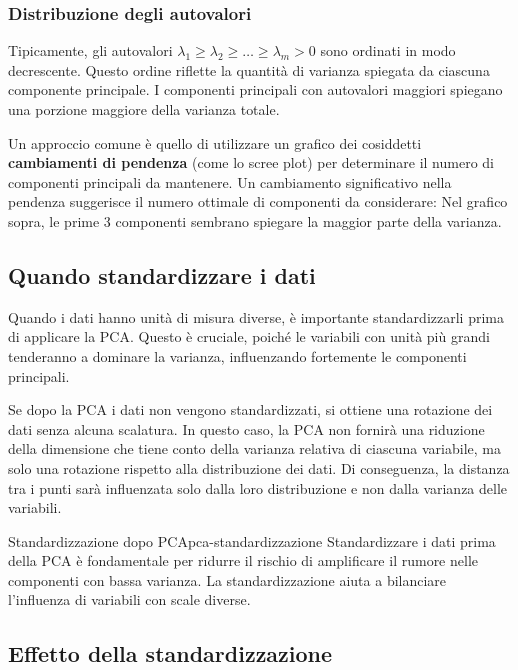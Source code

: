 \subsubsection{Distribuzione degli autovalori}

Tipicamente, gli autovalori \( \lambda_1 \geq \lambda_2 \geq \dots \geq \lambda_m > 0 \) sono ordinati in modo decrescente. Questo ordine riflette la quantità di varianza spiegata da ciascuna componente principale. I componenti principali con autovalori maggiori spiegano una porzione maggiore della varianza totale.

Un approccio comune è quello di utilizzare un grafico dei cosiddetti \textbf{cambiamenti di pendenza} (come lo scree plot) per determinare il numero di componenti principali da mantenere. Un cambiamento significativo nella pendenza suggerisce il numero ottimale di componenti da considerare:
Nel grafico sopra, le prime 3 componenti sembrano spiegare la maggior parte della varianza.

\subsection{Quando standardizzare i dati}

Quando i dati hanno unità di misura diverse, è importante standardizzarli prima di applicare la PCA. Questo è cruciale, poiché le variabili con unità più grandi tenderanno a dominare la varianza, influenzando fortemente le componenti principali.

Se dopo la PCA i dati non vengono standardizzati, si ottiene una rotazione dei dati senza alcuna scalatura. In questo caso, la PCA non fornirà una riduzione della dimensione che tiene conto della varianza relativa di ciascuna variabile, ma solo una rotazione rispetto alla distribuzione dei dati. Di conseguenza, la distanza tra i punti sarà influenzata solo dalla loro distribuzione e non dalla varianza delle variabili.

\begin{nota}{Standardizzazione dopo PCA}{pca-standardizzazione}
Standardizzare i dati prima della PCA è fondamentale per ridurre il rischio di amplificare il rumore nelle componenti con bassa varianza. La standardizzazione aiuta a bilanciare l'influenza di variabili con scale diverse.
\end{nota}

\subsection{Effetto della standardizzazione}

